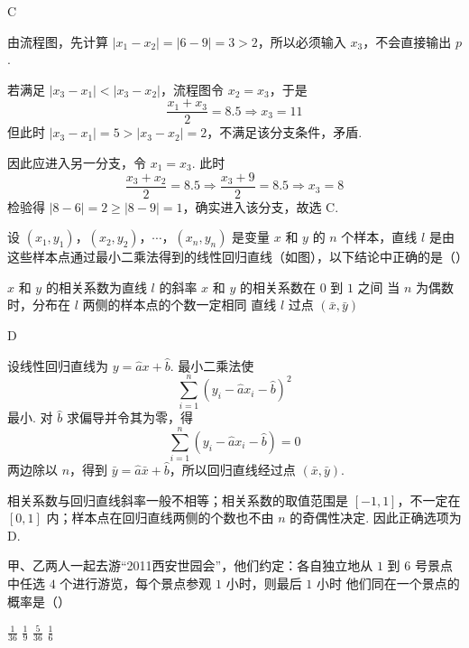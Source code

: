 \begin{answer}
C
\end{answer}

\begin{solution}
由流程图，先计算 \(|x_1-x_2|=|6-9|=3>2\)，所以必须输入 \(x_3\)，不会直接输出 \(p\).

若满足 \(|x_3-x_1|<|x_3-x_2|\)，流程图令 \(x_2=x_3\)，于是
\[
\frac{x_1+x_3}{2}=8.5\Longrightarrow x_3=11
\]
但此时 \(|x_3- x_1|=5>|x_3-x_2|=2\)，不满足该分支条件，矛盾.

因此应进入另一分支，令 \(x_1=x_3\). 此时
\[
\frac{x_3+x_2}{2}=8.5\Longrightarrow \frac{x_3+9}{2}=8.5\Longrightarrow x_3=8
\]
检验得 \(|8-6|=2\geqslant|8-9|=1\)，确实进入该分支，故选 C.
\end{solution}

\begin{problem}
设 \((x_{1}, y_{1})\)，\((x_{2}, y_{2})\)，\(\cdots\)，\((x_{n}, y_{n})\) 是变量 \(x\) 和 \(y\) 的 \(n\) 个样本，直线 \(l\) 是由这些样本点通过最小二乘法得到的线性回归直线（如图），以下结论中正确的是（\quad）


\choices
    {\(x\) 和 \(y\) 的相关系数为直线 \(l\) 的斜率}
    {\(x\) 和 \(y\) 的相关系数在 \(0\) 到 \(1\) 之间}
    {当 \(n\) 为偶数时，分布在 \(l\) 两侧的样本点的个数一定相同}
    {直线 \(l\) 过点 \((\bar{x}, \bar{y})\)}
\end{problem}

\begin{answer}
D
\end{answer}

\begin{solution}
设线性回归直线为 \(y=\hat{a}x+\hat{b}\). 最小二乘法使
\[
\sum_{i=1}^{n}(y_i-\hat{a}x_i-\hat{b})^2
\]
最小. 对 \(\hat{b}\) 求偏导并令其为零，得
\[
\sum_{i=1}^{n}(y_i-\hat{a}x_i-\hat{b})=0
\]
两边除以 \(n\)，得到 \(\bar{y}=\hat{a}\bar{x}+\hat{b}\)，所以回归直线经过点 \((\bar{x},\bar{y})\).

相关系数与回归直线斜率一般不相等；相关系数的取值范围是 \([-1,1]\)，不一定在 \([0,1]\) 内；样本点在回归直线两侧的个数也不由 \(n\) 的奇偶性决定. 因此正确选项为 D.
\end{solution}

\begin{problem}
甲、乙两人一起去游“2011西安世园会”，他们约定：各自独立地从 \(1\) 到 \(6\) 号景点中任选 \(4\) 个进行游览，每个景点参观 \(1\text{ 小时}\)，则最后 \(1\text{ 小时}\) 他们同在一个景点的概率是（\quad）

\choices
    {\( \frac{1}{36} \)}
    {\( \frac{1}{9} \)}
    {\( \frac{5}{36} \)}
    {\( \frac{1}{6} \)}
\end{problem}

